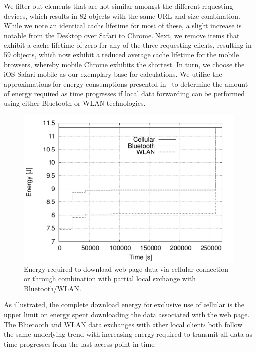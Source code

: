 \documentclass[letterpaper,conference]{IEEEtran}
\begin{document}
We filter out elements that are not similar amongst the different requesting devices, which results in 82 objects with the same URL and size combination. 
While we note an identical cache lifetime for most of these, a slight increase is notable from the Desktop over Safari to Chrome.  Next, we remove items that exhibit a cache lifetime of zero for any of the three requesting clients, resulting in 59 objects, which now exhibit a reduced average cache lifetime for the mobile browsers, whereby mobile Chrome exhibits the shortest.
In turn, we choose the iOS Safari mobile as our exemplary base for calculations. 
We utilize the approximations for energy consumptions presented in~\cite{PeFiWi11} to determine the amount of energy required as time progresses if local data forwarding can be performed using either Bluetooth or WLAN technologies. 
\begin{figure}
	\centering
	\includegraphics[width=.925\linewidth]{energy_ios_time}
	\caption{Energy required to download web page data via cellular connection or through combination with partial local exchange with Bluetooth/WLAN.}
	\label{fig:ios_time_energy}
\end{figure}
As illustrated, the complete download energy for exclusive use of cellular is the upper limit on energy spent downloading the data associated with the web page. 
The Bluetooth and WLAN data exchanges with other local clients both follow the same underlying trend with increasing energy required to transmit all data as time progresses from the last access point in time.
\end{document}
